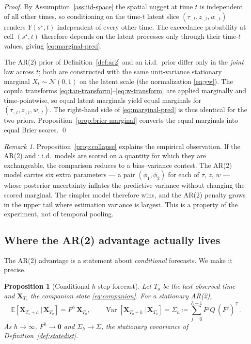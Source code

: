 \documentclass[11pt]{article}
\newtheorem{proposition}{Proposition}
\theoremstyle{definition}
\theoremstyle{remark}
\newtheorem{remark}{Remark}
\newcommand{\E}{\mathbb{E}}
\newcommand{\Var}{\operatorname{Var}}
\newcommand{\Norm}{\mathcal{N}}
\newcommand{\given}{\,\vert\,}
\begin{document}
\begin{proof}
By Assumption~\ref{ass:iid-space} the spatial nugget at time $t$ is
independent of all other times, so conditioning on the time-$t$ latent
slice $(\tau_{\cdot,t}, z_{\cdot,t}, w_{\cdot,t})$ renders
$Y(s^\star,t)$ independent of every other time. The exceedance
probability at cell $(s^\star,t)$ therefore depends on the latent
processes only through their time-$t$ values, giving
\eqref{eq:marginal-pred}.

The AR(2) prior of Definition~\ref{def:ar2} and an i.i.d.\ prior differ
only in the \emph{joint} law across $t$; both are constructed with the
same unit-variance stationary marginal $X_t \sim \Norm(0,1)$ on the
latent scale (the normalization \eqref{eq:yw}). The copula transforms
\eqref{eq:tau-transform}--\eqref{eq:w-transform} are applied
marginally and time-pointwise, so equal latent marginals yield equal
marginals for $(\tau_{\cdot,t},z_{\cdot,t},w_{\cdot,t})$. The
right-hand side of \eqref{eq:marginal-pred} is thus identical for the
two priors. Proposition~\ref{prop:brier-marginal} converts the equal
marginals into equal Brier scores. \qed
\end{proof}

\begin{remark}
\label{rem:bias-variance}
Proposition~\ref{prop:collapse} explains the empirical observation. If
the AR(2) and i.i.d.\ models are scored on a quantity for which they
are exchangeable, the comparison reduces to a bias--variance contest.
The AR(2) model carries six extra parameters --- a pair
$(\phi_1,\phi_2)$ for each of $\tau$, $z$, $w$ --- whose posterior
uncertainty inflates the predictive variance without changing the
scored marginal. The simpler model therefore wins, and the AR(2)
penalty grows in the upper tail where estimation variance is largest.
This is a property of the experiment, not of temporal pooling.
\end{remark}

\subsection{Where the AR(2) advantage actually lives}

The AR(2) advantage is a statement about \emph{conditional} forecasts.
We make it precise.

\begin{proposition}[Conditional $h$-step forecast]
\label{prop:forecast}
Let $T_o$ be the last observed time and $\bm X_{T_o}$ the companion
state \eqref{eq:companion}. For a stationary AR(2),
\begin{equation}
  \E[\bm X_{T_o+h} \given \bm X_{T_o}] = F^h\,\bm X_{T_o},
  \qquad
  \Var[\bm X_{T_o+h} \given \bm X_{T_o}]
    = \Sigma_h \coloneqq \sum_{j=0}^{h-1} F^j Q\,(F^j)^\top .
  \label{eq:hstep}
\end{equation}
As $h\to\infty$, $F^h \to \bm 0$ and $\Sigma_h \to \Sigma$, the
stationary covariance of Definition~\ref{def:statedist}.
\end{proposition}
\end{document}
